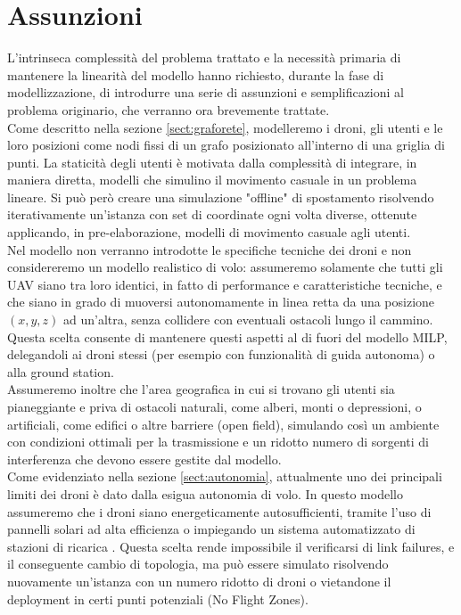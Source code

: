 \section{Assunzioni}
L'intrinseca complessità del problema trattato e la necessità primaria di mantenere la linearità del modello hanno richiesto, durante la fase di modellizzazione, di introdurre una serie di assunzioni e semplificazioni al problema originario, che verranno ora brevemente trattate. \\
Come descritto nella sezione \ref{sect:graforete}, modelleremo i droni, gli utenti e le loro posizioni come nodi fissi di un grafo posizionato all'interno di una griglia di punti. La staticità degli utenti è motivata dalla complessità di integrare, in maniera diretta, modelli che simulino il movimento casuale in un problema lineare. Si può però creare una simulazione "offline" di spostamento risolvendo iterativamente un'istanza con set di coordinate ogni volta diverse, ottenute applicando, in pre-elaborazione, modelli di movimento casuale agli utenti.\\
Nel modello non verranno introdotte le specifiche tecniche dei droni e non considereremo un modello realistico di volo: assumeremo solamente che tutti gli UAV siano tra loro identici, in fatto di performance e caratteristiche tecniche, e che siano in grado di muoversi autonomamente in linea retta da una posizione $(x,y,z)$ ad un'altra, senza collidere con eventuali ostacoli lungo il cammino. Questa scelta consente di mantenere questi aspetti al di fuori del modello MILP, delegandoli ai droni stessi (per esempio con funzionalità di guida autonoma) o alla ground station. \\
Assumeremo inoltre che l'area geografica in cui si trovano gli utenti sia pianeggiante e priva di ostacoli naturali, come alberi, monti o depressioni, o artificiali, come edifici o altre barriere (open field), simulando così un ambiente con condizioni ottimali per la trasmissione e un ridotto numero di sorgenti di interferenza che devono essere gestite dal modello. \\
Come evidenziato nella sezione \ref{sect:autonomia}, attualmente uno dei principali limiti dei droni è dato dalla esigua autonomia di volo. In questo modello assumeremo che i droni siano energeticamente autosufficienti, tramite l'uso di pannelli solari ad alta efficienza \cite{alta} o impiegando un sistema automatizzato di stazioni di ricarica \cite{Song2014}. 
Questa scelta rende impossibile il verificarsi di link failures, e il conseguente cambio di topologia, ma può essere simulato risolvendo nuovamente un'istanza con un numero ridotto di droni o vietandone il deployment in certi punti potenziali (No Flight Zones). \\
